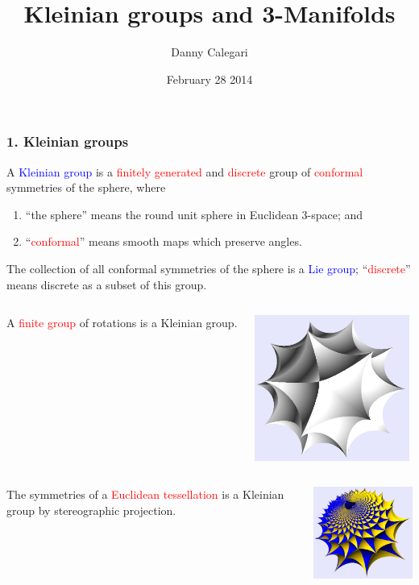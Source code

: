 \documentclass{beamer}
\title{Kleinian groups and 3-Manifolds}
\author{Danny Calegari}
\date{February 28 2014}
\begin{document}
\frame{\titlepage}
\frame
{
\frametitle{1. Kleinian groups}

A \textcolor{blue}{Kleinian group} is a \textcolor{red}{finitely generated} and 
\textcolor{red}{discrete} group of \textcolor{red}{conformal} symmetries of the 
\textcolor{dgreen}{sphere}, where

\begin{enumerate}
\item{``the \textcolor{dgreen}{sphere}'' means the round unit sphere in Euclidean 3-space; and}
\item{``\textcolor{red}{conformal}'' means smooth maps which preserve angles.}
\end{enumerate}

The collection of all conformal symmetries of the sphere is a \textcolor{blue}{Lie group}; ``\textcolor{red}{discrete}''
means discrete as a subset of this group.
}
\frame
{
\begin{columns}[c]
\column{1in}
A \textcolor{red}{finite group} of
rotations is a Kleinian group.
\column{2in}
\begin{center}
\includegraphics[width=2in]{icosahedron.png}
\end{center}
\end{columns}
}
\frame
{
\begin{columns}[c]
\column{1.1in}
The symmetries of a 
\textcolor{red}{Euclidean tessellation}
is a Kleinian group
by stereographic
projection.
\column{2in}
\begin{center}
\includegraphics[width=2in]{parabolic.png}
\end{center}
\end{columns}
}
\end{document}

